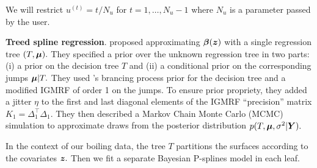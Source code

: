 We will restrict $u^{(t)} = t/N_{u}$ for $t = 1, \ldots, N_{u} - 1$ where $N_{u}$ is a parameter passed by the user.

\textbf{Treed spline regression}.
\citet{Low-Kam2015} proposed approximating $\boldsymbol{\beta}(\bm{z})$ with a single regression tree $(T,\boldsymbol{\mu}).$
They specified a prior over the unknown regression tree in two parts: (i) a prior on the decision tree $T$ and (ii) a conditional prior on the corresponding jumps $\boldsymbol{\mu} \vert T.$
They used \citet{Chipman1998}'s brancing process prior for the decision tree and a modified IGMRF of order 1 on the jumps.
To ensure prior propriety, they added a jitter $\eta$ to the first and last diagonal elements of the IGMRF ``precision'' matrix $K_{1} = \Delta_{1}^{\top}\Delta_{1}.$
They then described a Markov Chain Monte Carlo (MCMC) simulation to approximate draws from the posterior distribution $p(T, \boldsymbol{\mu}, \sigma^{2} \vert \bm{Y}).$

In the context of our boiling data, the tree $T$ partitions the surfaces according to the covariates $\bm{z}.$
Then we fit a separate Bayesian P-splines model in each leaf.
